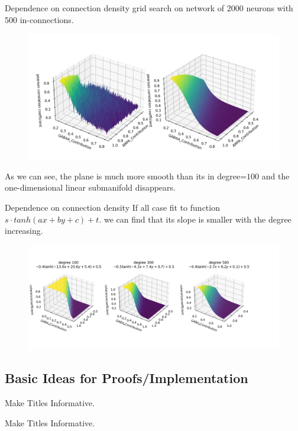 \documentclass{beamer}
\begin{document}
\begin{frame}{Dependence on connection density}
	grid search on network of 2000 neurons with 500 in-connections.
	\begin{figure}[htbp]
		\centering
		\includegraphics[width=0.85\linewidth]{fig/degree_influence_3d}
	\end{figure}
	As we can see, the plane is much more smooth than its in degree=$ 100 $ and the one-dimensional linear submanifold disappears.
\end{frame}

\begin{frame}{Dependence on connection density}
	If all case fit to function $ s\cdot tanh(ax+by+c) + t $. we can find that its slope is smaller with the degree increasing.
	\begin{figure}[htbp]
		\centering
		\includegraphics[width=0.85\linewidth]{fig/fit_surface}
	\end{figure}
	
\end{frame}


\subsection{Basic Ideas for Proofs/Implementation}

\begin{frame}{Make Titles Informative.}
\end{frame}

\begin{frame}{Make Titles Informative.}
\end{frame}
\end{document}
